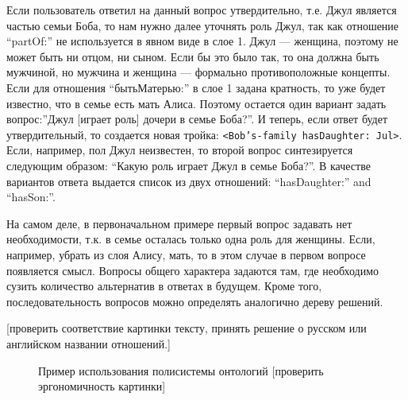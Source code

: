 \documentclass[utf8]{../IncArticle}
\newcommand{\e}[2][fcolor]{\textcolor{pcolor}{[}\textcolor{#1}{#2}\textcolor{pcolor}{]}}
\begin{document}
Если пользователь ответил на данный вопрос утвердительно, т.е. Джул
является частью семьи Боба, то нам нужно далее уточнять роль Джул, так
как отношение ``partOf:'' не используется в явном виде в слое 1.  Джул
--- женщина, поэтому не может быть ни отцом, ни сыном. Если бы это было
так, то она должна быть мужчиной, но мужчина и женщина --- формально
противоположные концепты.  Если для отношения ``бытьМатерью:'' в слое
1 задана кратность, то уже будет известно, что в семье есть мать
Алиса.  Поэтому остается один вариант задать вопрос:''Джул [играет
роль] дочери в семье Боба?''.  И теперь, если ответ будет
утвердительный, то создается новая тройка: \texttt{<Bob's-family
  hasDaughter: Jul>}. Если, например, пол Джул неизвестен, то второй
вопрос синтезируется следующим образом: ``Какую роль играет Джул в
семье Боба?''.  В качестве вариантов ответа выдается список из двух
отношений: ``hasDaughter:'' and ``hasSon:''.

На самом деле, в первоначальном примере первый вопрос задавать нет
необходимости, т.к. в семье осталась только одна роль для женщины.
Если, например, убрать из слоя Алису, мать, то в этом случае в первом
вопросе появляется смысл.  Вопросы общего характера задаются там, где
необходимо сузить количество альтернатив в ответах в будущем.  Кроме
того, последовательность вопросов можно определять аналогично дереву
решений.

\e{проверить соответствие картинки тексту, принять решение о русском
  или английском названии отношений.}

\begin{figure}
\begin{center}
\sf
\def\svgwidth{0.7\linewidth}

\end{center}
\caption{Пример использования полисистемы онтологий \e{проверить
    эргономичность картинки}}
\label{OPSA}
\end{figure}









\end{document}
